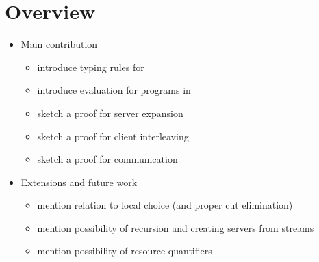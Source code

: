 \documentclass[a4paper,UKenglish]{lipics-v2016}
\begin{document}
\section{Overview}
\begin{itemize}
\item Main contribution
  \begin{itemize}
  \item introduce typing rules for \nodcap
  \item introduce evaluation for programs in \nodcap
  \item sketch a proof for server expansion
  \item sketch a proof for client interleaving
  \item sketch a proof for communication
  \end{itemize}
\item Extensions and future work
  \begin{itemize}
  \item mention relation to local choice (and proper cut elimination)
  \item mention possibility of recursion and creating servers from streams
  \item mention possibility of resource quantifiers
  \end{itemize} 
\end{itemize}
\end{document}
